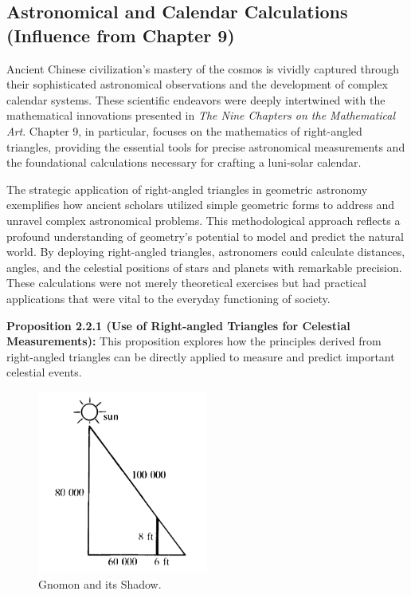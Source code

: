 \documentclass[10pt]{article}
\begin{document}
\vspace{15pt}

\subsection{Astronomical and Calendar Calculations (Influence from Chapter 9)}

\vspace{7pt}

Ancient Chinese civilization's mastery of the cosmos is vividly captured through their sophisticated astronomical observations and the development of complex calendar systems. These scientific endeavors were deeply intertwined with the mathematical innovations presented in \textit{The Nine Chapters on the Mathematical Art}. Chapter 9, in particular, focuses on the mathematics of right-angled triangles, providing the essential tools for precise astronomical measurements and the foundational calculations necessary for crafting a luni-solar calendar.

\vspace{7pt}

The strategic application of right-angled triangles in geometric astronomy exemplifies how ancient scholars utilized simple geometric forms to address and unravel complex astronomical problems. This methodological approach reflects a profound understanding of geometry's potential to model and predict the natural world. By deploying right-angled triangles, astronomers could calculate distances, angles, and the celestial positions of stars and planets with remarkable precision. These calculations were not merely theoretical exercises but had practical applications that were vital to the everyday functioning of society.

\vspace{7pt}

\textbf{Proposition 2.2.1 (Use of Right-angled Triangles for Celestial Measurements):} This proposition explores how the principles derived from right-angled triangles can be directly applied to measure and predict important celestial events.

\vspace{15pt}

\begin{figure}[ht!]
\centering
\includegraphics[width=0.5\textwidth]{./images/sec2.2-gnomon.png}
\caption{Gnomon and its Shadow. \autocite[p.~30]{Li_Du_Crossley_Lun}}
\label{fig:gnomon}
\end{figure}
\end{document}
